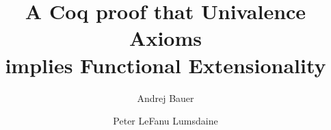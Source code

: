 \documentclass{article}
\begin{document}
\author{Andrej Bauer \and Peter LeFanu Lumsdaine}
\title{A Coq proof that Univalence Axioms\\
implies Functional Extensionality}
\maketitle

\end{document}
